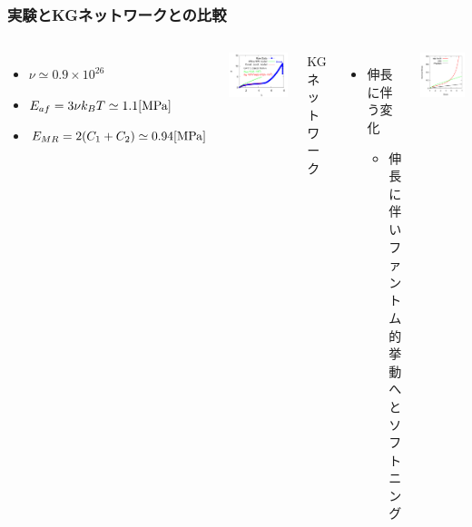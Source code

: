 \documentclass[11pt, dvipdfmx]{beamer}
\begin{document}
\begin{frame}
\frametitle{実験とKGネットワークとの比較}
\begin{columns}[totalwidth=1\textwidth]
\begin{itemize}
\item
$\nu \simeq 0.9\times 10^{26}$
\item
$E_{af}=3\nu k_B T \simeq 1.1 [{\rm MPa}]$
\item
$E_{MR}= 2(C_1 + C_2) \simeq 0.94 [{\rm MPa}]$
\end{itemize}

\centering
\includegraphics[width=\columnwidth]{./fig/SS_MR_6_fit.pdf}

KGネットワーク
	\begin{itemize}
	\item
	伸長に伴う変化
		\begin{itemize}
		\item
		伸長に伴いファントム的挙動へとソフトニング
		\end{itemize}
	\end{itemize}
\centering
\includegraphics[width=0.8\columnwidth]{./fig/SS-2.pdf}
\end{columns}
\end{frame}
\end{document}
